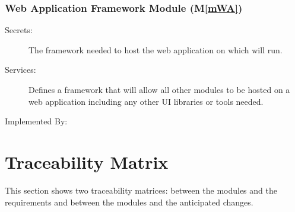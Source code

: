 \documentclass[12pt, titlepage]{article}
\newcommand{\mref}[1]{M\ref{#1}}
\begin{document}
\subsubsection{Web Application Framework Module (\mref{mWA})}

\begin{description}
  \item[Secrets:]The framework needed to host the web application on which
  \progname{} will run.
  \item[Services:]Defines a framework that will allow all other modules to be
  hosted on a web application including any other UI libraries or tools
  needed.
  \item[Implemented By:] \progname{}
\end{description}

\section{Traceability Matrix} \label{SecTM}

This section shows two traceability matrices: between the modules and the
requirements and between the modules and the anticipated changes.
\end{document}
